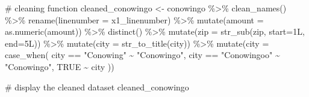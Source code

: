 \documentclass[
  letterpaper,
  DIV=11,
  numbers=noendperiod]{scrreprt}
\newenvironment{Shaded}{\begin{snugshade}}{\end{snugshade}}
\newcommand{\AttributeTok}[1]{\textcolor[rgb]{0.40,0.45,0.13}{#1}}
\newcommand{\CommentTok}[1]{\textcolor[rgb]{0.37,0.37,0.37}{#1}}
\newcommand{\ConstantTok}[1]{\textcolor[rgb]{0.56,0.35,0.01}{#1}}
\newcommand{\FunctionTok}[1]{\textcolor[rgb]{0.28,0.35,0.67}{#1}}
\newcommand{\NormalTok}[1]{\textcolor[rgb]{0.00,0.23,0.31}{#1}}
\newcommand{\OtherTok}[1]{\textcolor[rgb]{0.00,0.23,0.31}{#1}}
\newcommand{\SpecialCharTok}[1]{\textcolor[rgb]{0.37,0.37,0.37}{#1}}
\newcommand{\StringTok}[1]{\textcolor[rgb]{0.13,0.47,0.30}{#1}}
\begin{document}
\begin{Shaded}
\begin{Highlighting}[]
\CommentTok{\# cleaning function}
\NormalTok{cleaned\_conowingo }\OtherTok{\textless{}{-}}\NormalTok{ conowingo }\SpecialCharTok{\%\textgreater{}\%}
  \FunctionTok{clean\_names}\NormalTok{() }\SpecialCharTok{\%\textgreater{}\%}
  \FunctionTok{rename}\NormalTok{(}\AttributeTok{linenumber =}\NormalTok{ x1\_linenumber) }\SpecialCharTok{\%\textgreater{}\%}
  \FunctionTok{mutate}\NormalTok{(}\AttributeTok{amount =} \FunctionTok{as.numeric}\NormalTok{(amount)) }\SpecialCharTok{\%\textgreater{}\%}
  \FunctionTok{distinct}\NormalTok{() }\SpecialCharTok{\%\textgreater{}\%}
  \FunctionTok{mutate}\NormalTok{(}\AttributeTok{zip =} \FunctionTok{str\_sub}\NormalTok{(zip, }\AttributeTok{start=}\NormalTok{1L, }\AttributeTok{end=}\NormalTok{5L)) }\SpecialCharTok{\%\textgreater{}\%}
  \FunctionTok{mutate}\NormalTok{(}\AttributeTok{city =} \FunctionTok{str\_to\_title}\NormalTok{(city)) }\SpecialCharTok{\%\textgreater{}\%}
  \FunctionTok{mutate}\NormalTok{(}\AttributeTok{city =} \FunctionTok{case\_when}\NormalTok{(}
\NormalTok{    city }\SpecialCharTok{==} \StringTok{"Conowing"} \SpecialCharTok{\textasciitilde{}} \StringTok{"Conowingo"}\NormalTok{,}
\NormalTok{    city }\SpecialCharTok{==} \StringTok{"Conowingoo"} \SpecialCharTok{\textasciitilde{}} \StringTok{"Conowingo"}\NormalTok{,}
    \ConstantTok{TRUE} \SpecialCharTok{\textasciitilde{}}\NormalTok{ city}
\NormalTok{  ))}


\CommentTok{\# display the cleaned dataset}
\NormalTok{cleaned\_conowingo}
\end{Highlighting}
\end{Shaded}
\end{document}
